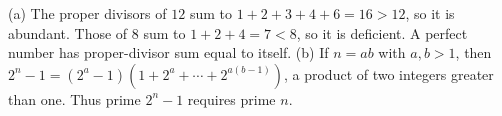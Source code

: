 (a) The proper divisors of $12$ sum to $1+2+3+4+6=16>12$, so it is abundant. Those of $8$ sum to $1+2+4=7<8$, so it is deficient. A perfect number has proper-divisor sum equal to itself. (b) If $n=ab$ with $a,b>1$, then $2^n-1=(2^a-1)(1+2^a+\cdots+2^{a(b-1)})$, a product of two integers greater than one. Thus prime $2^n-1$ requires prime $n$.
